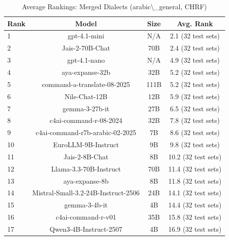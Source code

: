 \begin{table}[htbp]
\centering
\caption{Average Rankings: Merged Dialects (arabic\textbackslash{}_general, CHRF)}
\label{tab:avg_rankings_chrf_arabic_general}
\begin{tabular}{l@{\hspace{3pt}}c@{\hspace{3pt}}c@{\hspace{3pt}}c}
\toprule
Rank & Model & Size & Avg. Rank \\
\midrule
1 & gpt-4.1-mini & N/A & 2.1 (32 test sets) \\
2 & Jais-2-70B-Chat & 70B & 2.4 (32 test sets) \\
3 & gpt-4.1-nano & N/A & 4.9 (32 test sets) \\
4 & aya-expanse-32b & 32B & 5.2 (32 test sets) \\
5 & command-a-translate-08-2025 & 111B & 5.2 (32 test sets) \\
6 & Nile-Chat-12B & 12B & 5.9 (32 test sets) \\
7 & gemma-3-27b-it & 27B & 6.5 (32 test sets) \\
8 & c4ai-command-r-08-2024 & 32B & 7.8 (32 test sets) \\
9 & c4ai-command-r7b-arabic-02-2025 & 7B & 8.6 (32 test sets) \\
10 & EuroLLM-9B-Instruct & 9B & 9.8 (32 test sets) \\
11 & Jais-2-8B-Chat & 8B & 10.2 (32 test sets) \\
12 & Llama-3.3-70B-Instruct & 70B & 11.4 (32 test sets) \\
13 & aya-expanse-8b & 8B & 11.8 (32 test sets) \\
14 & Mistral-Small-3.2-24B-Instruct-2506 & 24B & 14.1 (32 test sets) \\
15 & gemma-3-4b-it & 4B & 14.4 (32 test sets) \\
16 & c4ai-command-r-v01 & 35B & 15.8 (32 test sets) \\
17 & Qwen3-4B-Instruct-2507 & 4B & 16.9 (32 test sets) \\
\bottomrule
\end{tabular}
\end{table}